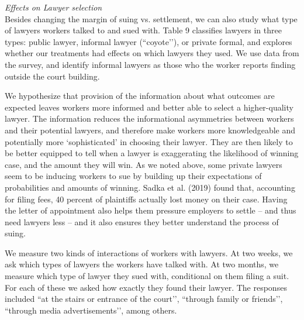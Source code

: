 \documentclass[oneside,12pt]{article}
\begin{document}
\noindent\emph{Effects on Lawyer selection}\\
Besides changing the margin of suing vs. settlement, we can also study what type of lawyers workers talked to and sued with. Table 9 classifies lawyers in three types: public lawyer, informal lawyer (“coyote’’), or private formal, and explores whether our treatments had effects on which lawyers they used. We use data from the survey, and identify informal lawyers as those who the worker reports finding outside the court building. 

We hypothesize that provision of the information about what outcomes are expected leaves workers more informed and better able to select a higher-quality lawyer. The information reduces the informational asymmetries between workers and their potential lawyers, and therefore make workers more knowledgeable and potentially more ‘sophisticated’ in choosing their lawyer. They are then likely to be better equipped to tell when a lawyer is exaggerating the likelihood of winning case, and the amount they will win. As we noted above, some private lawyers seem to be inducing workers to sue by building up their expectations of probabilities and amounts of winning. Sadka et al. (2019) found that, accounting for filing fees, 40 percent of plaintiffs actually lost money on their case. Having the letter of appointment also helps them pressure employers to settle – and thus need lawyers less – and it also ensures they better understand the process of suing. 

We measure two kinds of interactions of workers with lawyers. At two weeks, we ask which types of lawyers the workers have talked with. At two months, we measure which type of lawyer they sued with, conditional on them filing a suit. For each of these we asked how exactly they found their lawyer. The responses included “at the stairs or entrance of the court’’, “through family or friends’’, “through media advertisements’’, among others.
\end{document}
